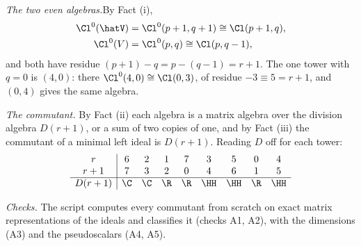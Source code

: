 \textit{The two even algebras.}\enspace By Fact (i),
\begin{align*}
\Cl^{0}(\hatV) &= \Cl^{0}(p+1, q+1) \cong \Cl(p+1, q), \\
\Cl^{0}(V) &= \Cl^{0}(p, q) \cong \Cl(p, q-1),
\end{align*}
and both have residue $(p+1) - q = p - (q-1) = r + 1$. The one tower with $q = 0$ is $(4,0)$: there $\Cl^{0}(4,0) \cong \Cl(0,3)$, of residue $-3 \equiv 5 = r + 1$, and $(0,4)$ gives the same algebra.



\emph{The commutant.}  By Fact (ii) each algebra is a matrix algebra over the division algebra $D(r+1)$, or a sum of two copies of one, and by Fact (iii) the commutant of a minimal left ideal is $D(r+1)$. Reading $D$ off for each tower:
\[
\begin{array}{c|cccccccc}
r & 6 & 2 & 1 & 7 & 3 & 5 & 0 & 4 \\
r + 1 & 7 & 3 & 2 & 0 & 4 & 6 & 1 & 5 \\ \hline
D(r+1) & \C & \C & \R & \R & \HH & \HH & \R & \HH
\end{array}
\]



\emph{Checks.}  The script computes every commutant from scratch on exact matrix representations of the ideals and classifies it (checks A1, A2), with the dimensions (A3) and the pseudoscalars (A4, A5).
